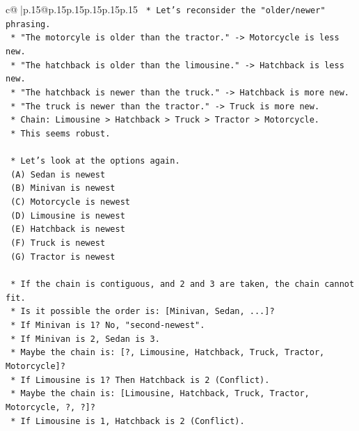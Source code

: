 \documentclass{article}
\begin{document}
{\begin{supertabular}{c@{$\;$}|p{.15\linewidth}@{}p{.15\linewidth}p{.15\linewidth}p{.15\linewidth}p{.15\linewidth}p{.15\linewidth}}
{{{\texttt{            *   Let's reconsider the "older/newer" phrasing.} \\
\texttt{                *   "The motorcyle is older than the tractor." {-}> Motorcycle is less new.} \\
\texttt{                *   "The hatchback is older than the limousine." {-}> Hatchback is less new.} \\
\texttt{                *   "The hatchback is newer than the truck." {-}> Hatchback is more new.} \\
\texttt{                *   "The truck is newer than the tractor." {-}> Truck is more new.} \\
\texttt{                *   Chain: Limousine > Hatchback > Truck > Tractor > Motorcycle.} \\
\texttt{                *   This seems robust.} \\
\\ 
\texttt{    *   Let's look at the options again.} \\
\texttt{        (A) Sedan is newest} \\
\texttt{        (B) Minivan is newest} \\
\texttt{        (C) Motorcycle is newest} \\
\texttt{        (D) Limousine is newest} \\
\texttt{        (E) Hatchback is newest} \\
\texttt{        (F) Truck is newest} \\
\texttt{        (G) Tractor is newest} \\
\\ 
\texttt{    *   If the chain is contiguous, and 2 and 3 are taken, the chain cannot fit.} \\
\texttt{    *   Is it possible the order is: {[}Minivan, Sedan, ...{]}?} \\
\texttt{        *   If Minivan is 1? No, "second{-}newest".} \\
\texttt{        *   If Minivan is 2, Sedan is 3.} \\
\texttt{        *   Maybe the chain is: {[}?, Limousine, Hatchback, Truck, Tractor, Motorcycle{]}?} \\
\texttt{            *   If Limousine is 1? Then Hatchback is 2 (Conflict).} \\
\texttt{        *   Maybe the chain is: {[}Limousine, Hatchback, Truck, Tractor, Motorcycle, ?, ?{]}?} \\
\texttt{            *   If Limousine is 1, Hatchback is 2 (Conflict).} \\
}}}
\end{supertabular}}
\end{document}
